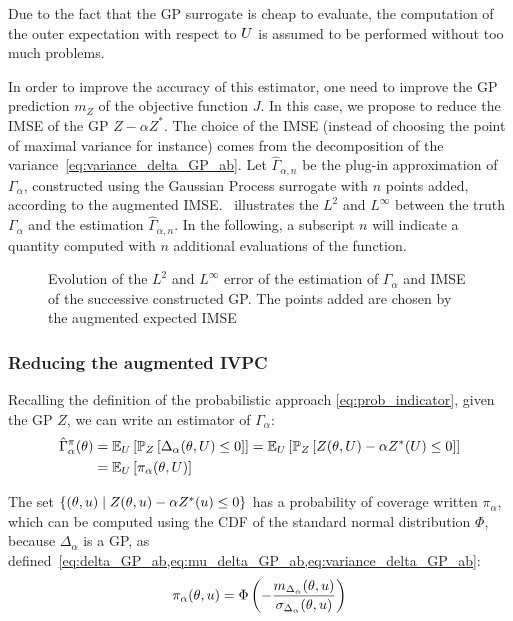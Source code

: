 \documentclass[../../Main_ManuscritThese.tex]{subfiles}
\newcommand\imgpath{/home/victor/acadwriting/Manuscrit/Text/Chapter4/img/}
\begin{document}
  Due to the fact that the GP surrogate is cheap to evaluate, the
  computation of the outer expectation with respect to $U$ is
  assumed to be performed without too much problems.

  In order to improve the accuracy of this estimator, one need to
  improve the GP prediction $m_Z$ of the objective function $J$.
  In this case, we propose to reduce the IMSE of the GP
  $Z - \alpha Z^*$. The choice of the IMSE (instead of choosing the
  point of maximal variance for instance) comes from the decomposition
  of the variance~\cref{eq:variance_delta_GP_ab}.  Let
  $\hat{\Gamma}_{\alpha,n}$ be the plug-in approximation of
  $\Gamma_\alpha$, constructed using the Gaussian Process surrogate
  with $n$ points added, according to the augmented
  IMSE.~ illustrates the $L^2$ and
  $L^{\infty}$ between the truth $\Gamma_\alpha$ and the estimation
  $\hat{\Gamma}_{\alpha,n}$. In the following, a subscript $n$ will
  indicate a quantity computed with $n$ additional evaluations of the
  function.

\begin{figure}[ht]
  \centering
  
  \caption{\label{fig:IMSE_enrichment} Evolution of the $L^2$ and $L^\infty$ error of the estimation of $\Gamma_\alpha$ and IMSE of the successive constructed GP. The points added are chosen by the augmented expected IMSE}
\end{figure}

  
\subsubsection{Reducing the augmented IVPC}

Recalling the definition of the probabilistic approach \cref{eq:prob_indicator}, given the GP $Z$, we can write an estimator of $\Gamma_{\alpha}$:
\begin{align}
  \hat{\Gamma}_{\alpha}^{\pi}(\theta) &= \mathbb{E}_U\left[ \mathbb{P}_{Z}\left[ \Delta_{\alpha}(\theta,U) \leq 0\right]\right] = \mathbb{E}_U\left[ \mathbb{P}_{Z}\left[ Z(\theta, U) - \alpha Z^*(U) \leq 0\right]\right] \\
                                   &= \mathbb{E}_U\left[\pi_{\alpha}(\theta,U)\right]
\end{align}

  
The set $\{(\theta, u) \mid Z(\theta, u) - \alpha Z^*(u)\leq 0\}$ has a probability of coverage written $\pi_{\alpha}$, which can be computed using the CDF of the standard normal distribution $\Phi$, because $\Delta_{\alpha}$ is a GP, as defined~\cref{eq:delta_GP_ab,eq:mu_delta_GP_ab,eq:variance_delta_GP_ab}:
\begin{equation}
  \label{eq:def_pialphaku}
  \pi_{\alpha}(\theta,u) = \Phi\left(-\frac{m_{\Delta_\alpha}(\theta,u)}{\sigma_{\Delta_\alpha}(\theta,u)}\right)
\end{equation}
\end{document}
